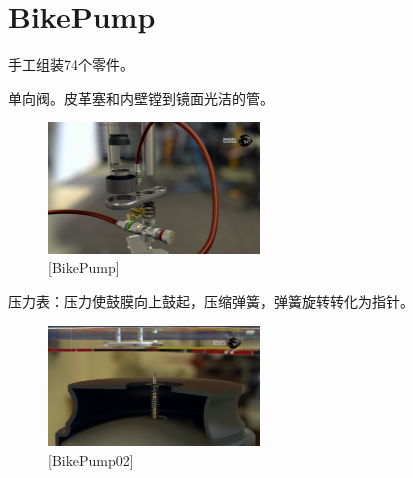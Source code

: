 \documentclass[UTF8]{../../../../RepresentationUniverse}
\begin{document}
\section{BikePump}

手工组装74个零件。 

单向阀。皮革塞和内壁镗到镜面光洁的管。

\begin{figure}[h]
    \centering
    \includegraphics[width=0.5\textwidth]{./src/figures/BikePump_20230422_122128.png}
    \caption{[BikePump]}
    \label{figure:BikePump}
\end{figure}


压力表：压力使鼓膜向上鼓起，压缩弹簧，弹簧旋转转化为指针。
\begin{figure}[h]
    \centering
    \includegraphics[width=0.5\textwidth]{./src/figures/BikePump02_20230422_122432.png}
    \caption{[BikePump02]}
    \label{figure:BikePump02}
\end{figure}
\end{document}

